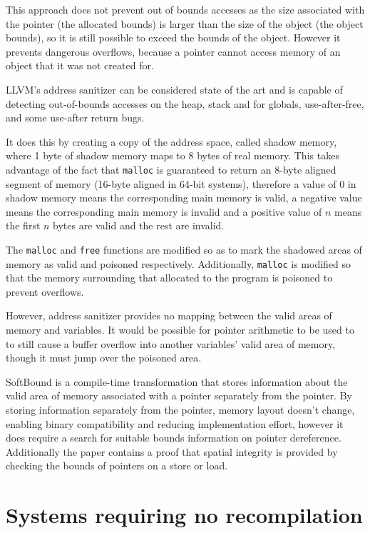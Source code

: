 This approach does not prevent out of bounds accesses as the size associated with the pointer (the allocated bounds) is larger than the size of the object (the object bounds), so it is still possible to exceed the bounds of the object.
However it prevents dangerous overflows, because a pointer cannot access memory of an object that it was not created for.

LLVM's address sanitizer \cite{llvmAddrSan, llvmAddrSanAlgo} can be considered state of the art and  is capable of detecting out-of-bounds accesses on the heap, stack and for globals, use-after-free, and some use-after return bugs.

It does this by creating a copy of the address space, called shadow memory, where 1 byte of shadow memory maps to 8 bytes of real memory.
This takes advantage of the fact that \verb!malloc! is guaranteed to return an 8-byte aligned segment of memory (16-byte aligned in 64-bit systems), therefore a value of 0 in shadow memory means the corresponding main memory is valid, a negative value means the corresponding main memory is invalid and a positive value of $n$ means the first $n$ bytes are valid and the rest are invalid.

The \verb!malloc! and \verb!free! functions are modified so as to mark the shadowed areas of memory as valid and poisoned respectively.
Additionally, \verb!malloc! is modified so that the memory surrounding that allocated to the program is poisoned to prevent overflows.

However, address sanitizer provides no mapping between the valid areas of memory and variables.
It would be possible for pointer arithmetic to be used to to still cause a buffer overflow into another variables' valid area of memory, though it must jump over the poisoned area.

SoftBound \cite{nagarakatte2009softbound} is a compile-time transformation that stores information about the valid area of memory associated with a pointer separately from the pointer.
By storing information separately from the pointer, memory layout doesn't change, enabling binary compatibility and reducing implementation effort, however it does require a search for suitable bounds information on pointer dereference.
Additionally the paper contains a proof that spatial integrity is provided by checking the bounds of pointers on a store or load.

\section{Systems requiring no recompilation}

